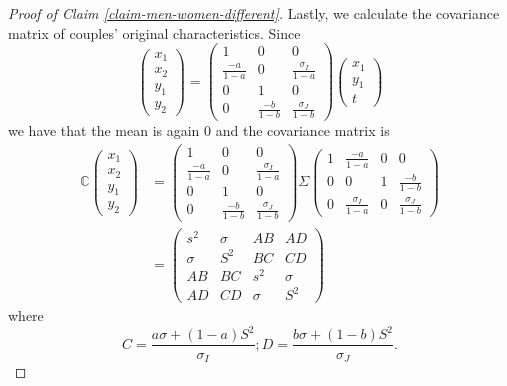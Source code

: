\documentclass[
  12pt,
]{article}
\theoremstyle{definition}
\theoremstyle{definition}
\theoremstyle{definition}
\theoremstyle{definition}
\theoremstyle{remark}
\begin{document}
\begin{proof}[Proof of Claim \ref{claim-men-women-different}]
Lastly, we calculate the covariance matrix of couples' original characteristics.
Since
\[
\left(\begin{array}{c}
x_{1}\\
x_{2}\\
y_{1}\\
y_{2}
\end{array}\right)=\left(\begin{array}{ccc}
1 & 0 & 0\\
\frac{-a}{1-a} & 0 & \frac{\sigma_{I}}{1-a}\\
0 & 1 & 0\\
0 & \frac{-b}{1-b} & \frac{\sigma_{J}}{1-b}
\end{array}\right)\left(\begin{array}{c}
x_{1}\\
y_{1}\\
t
\end{array}\right)
\]
we have that the mean is again 0 and the covariance matrix is 
\begin{align*}
\mathbb{C}\left(\begin{array}{c}
x_{1}\\
x_{2}\\
y_{1}\\
y_{2}
\end{array}\right) & =\left(\begin{array}{ccc}
1 & 0 & 0\\
\frac{-a}{1-a} & 0 & \frac{\sigma_{I}}{1-a}\\
0 & 1 & 0\\
0 & \frac{-b}{1-b} & \frac{\sigma_{J}}{1-b}
\end{array}\right)\Sigma\left(\begin{array}{cccc}
1 & \frac{-a}{1-a} & 0 & 0\\
0 & 0 & 1 & \frac{-b}{1-b}\\
0 & \frac{\sigma_{I}}{1-a} & 0 & \frac{\sigma_{J}}{1-b}
\end{array}\right)\\
 & =\left(\begin{array}{cccc}
s^{2} & \sigma & AB & AD\\
\sigma & S^{2} & BC & CD\\
AB & BC & s^{2} & \sigma\\
AD & CD & \sigma & S^{2}
\end{array}\right)
\end{align*}
where
\[
C=\frac{a\sigma+(1-a)S^{2}}{\sigma_{I}};D=\frac{b\sigma+(1-b)S^{2}}{\sigma_{J}}.
\]


\end{proof}
\end{document}
